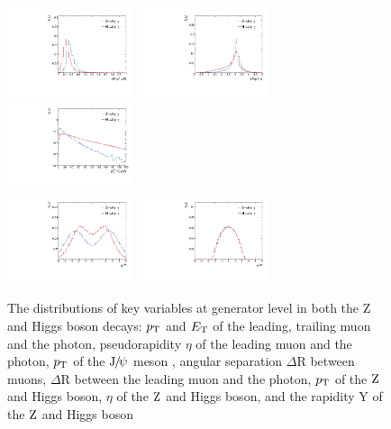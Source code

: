 \begin{figure}[p]
\begin{center}
\includegraphics[width=0.33\textwidth]{Fig/GenLevel_HJpsiG/plot_ZHJpsiG/ZHJpsiG_dRdimuon}~
\includegraphics[width=0.33\textwidth]{Fig/GenLevel_HJpsiG/plot_ZHJpsiG/ZHJpsiG_dRmu1pho}~
\includegraphics[width=0.33\textwidth]{Fig/GenLevel_HJpsiG/plot_ZHJpsiG/ZHJpsiG_mmgPt}\\
\includegraphics[width=0.33\textwidth]{Fig/GenLevel_HJpsiG/plot_ZHJpsiG/ZHJpsiG_mmgEta}~
\includegraphics[width=0.33\textwidth]{Fig/GenLevel_HJpsiG/plot_ZHJpsiG/ZHJpsiG_mmgRapidity}\\
\caption{The distributions of key variables at generator level in both the Z and Higgs boson decays: 
	$p_{\mathrm{T}}$ and $E_{\mathrm{T}}$ of the leading, trailing muon and the photon,
	pseudorapidity $\eta$ of the leading muon and the photon, $p_{\mathrm{T}}$ of the ${\mathrm{J}\hspace{-.08em}/\hspace{-.14em}\psi}$ meson , angular separation $\Delta \text{R}$ between muons, $\Delta \text{R}$ between the leading muon and the photon, $p_{\mathrm{T}}$ of the $\mathrm{Z}$ and Higgs boson, $\eta$ of the $\mathrm{Z}$ and Higgs boson, and the rapidity Y of the $\mathrm{Z}$ and Higgs boson}  
\label{fig:GenLevel_HJpsiG}\end{center}\end{figure}  


